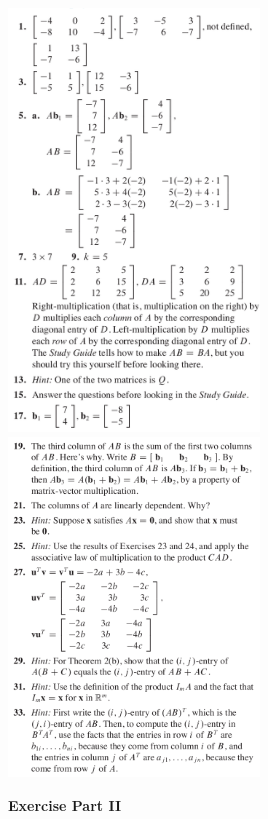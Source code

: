 \documentclass[a4paper,11pt,reqno]{amsart}
\numberwithin{equation}{section}
\begin{document}
\includegraphics[width=0.5\textwidth]{exercises/mo_1ans1.png}
\includegraphics[width=0.5\textwidth]{exercises/mo_1ans2.png}

\newpage

\textbf{Exercise Part II}
\end{document}
